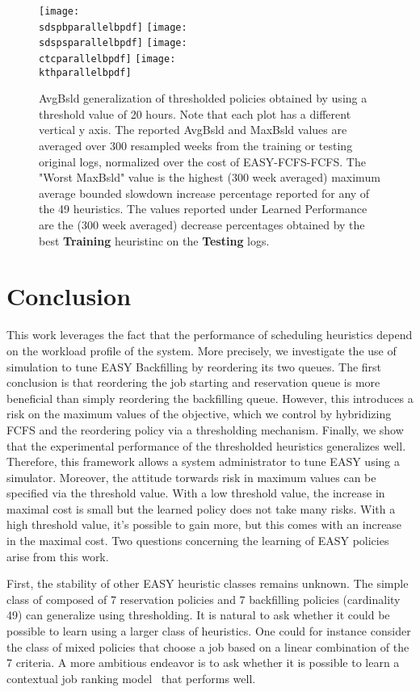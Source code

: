 \begin{figure*}[ht!]
  \centering
  \texttt{[image: \\sdspbparallelbpdf]}
  \texttt{[image: \\sdspsparallelbpdf]}
  \texttt{[image: \\ctcparallelbpdf]}
  \texttt{[image: \\kthparallelbpdf]}

  \caption{AvgBsld generalization of thresholded policies obtained by using a
    threshold value of 20 hours. Note that each plot has a different vertical y
    axis. The reported AvgBsld and MaxBsld values are averaged over 300
    resampled weeks from the training or testing original logs, normalized over
    the cost of EASY-FCFS-FCFS. The "Worst MaxBsld" value is the highest (300
    week averaged) maximum average bounded slowdown increase percentage
    reported for any of the 49 heuristics. The values reported under Learned
    Performance are the (300 week averaged) decrease percentages obtained by the
    best \textbf{Training} heuristinc on the \textbf{Testing} logs.}

  \label{fig:parb}
\end{figure*}

\section{Conclusion}

This work leverages the fact that the performance of scheduling heuristics
depend on the workload profile of the system. More precisely, we investigate
the use of simulation to tune EASY Backfilling by reordering its two queues.
The first conclusion is that reordering the job starting and reservation queue
is more beneficial than simply reordering the backfilling queue. However, this
introduces a risk on the maximum values of the objective, which we control by
hybridizing FCFS and the reordering policy via a thresholding mechanism.
Finally, we show that the experimental performance of the thresholded
heuristics generalizes well. Therefore, this framework allows a system
administrator to tune EASY using a simulator. Moreover, the attitude torwards
risk in maximum values can be specified via the threshold value. With a low
threshold value, the increase in maximal cost is small but the learned policy
does not take many risks. With a high threshold value, it's possible to gain
more, but this comes with an increase in the maximal cost. Two questions
concerning the learning of EASY policies arise from this work.

First, the stability of other EASY heuristic classes remains unknown. The
simple class of composed of 7 reservation policies and 7 backfilling policies
(cardinality 49) can generalize using thresholding. It is natural to ask
whether it could be possible to learn using a larger class of heuristics.  One
could for instance consider the class of mixed policies that choose a job based
on a linear combination of the 7 criteria. A more ambitious endeavor is to ask
whether it is possible to learn a contextual job ranking
model~\cite{joachims2002optimizing} that performs well.

